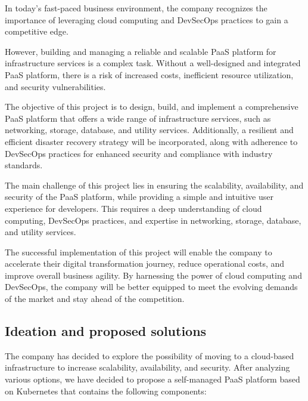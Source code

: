 \hspace{7mm}In today's fast-paced business environment, the company recognizes the importance of leveraging cloud computing and DevSecOps practices to gain a competitive edge. 

\hspace{7mm}However, building and managing a reliable and scalable PaaS platform for infrastructure services is a complex task. Without a well-designed and integrated PaaS platform, there is a risk of increased costs, inefficient resource utilization, and security vulnerabilities.

\hspace{7mm}The objective of this project is to design, build, and implement a comprehensive PaaS platform that offers a wide range of infrastructure services, such as networking, storage, database, and utility services. Additionally, a resilient and efficient disaster recovery strategy will be incorporated, along with adherence to DevSecOps practices for enhanced security and compliance with industry standards.

\hspace{7mm}The main challenge of this project lies in ensuring the scalability, availability, and security of the PaaS platform, while providing a simple and intuitive user experience for developers. This requires a deep understanding of cloud computing, DevSecOps practices, and expertise in networking, storage, database, and utility services.

\hspace{7mm}The successful implementation of this project will enable the company to accelerate their digital transformation journey, reduce operational costs, and improve overall business agility. By harnessing the power of cloud computing and DevSecOps, the company will be better equipped to meet the evolving demands of the market and stay ahead of the competition.

\subsection{Ideation and proposed solutions} 

\hspace{7mm}The company has decided to explore the possibility of moving to a cloud-based infrastructure to increase scalability, availability, and security. After analyzing various options, we have decided to propose a self-managed PaaS platform based on Kubernetes that contains the following components: 

